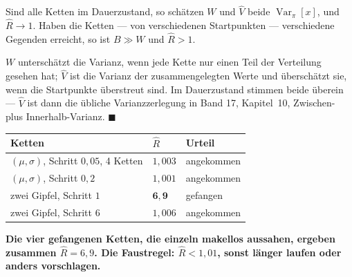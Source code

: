 \begin{merksatz}
Sind alle Ketten im Dauerzustand, so schätzen $W$ und $\hat V$ beide $\operatorname{Var}_\pi[x]$, und $\hat R \to 1$. Haben die Ketten --- von verschiedenen Startpunkten --- verschiedene Gegenden erreicht, so ist $B \gg W$ und $\hat R > 1$.

$W$ unterschätzt die Varianz, wenn jede Kette nur einen Teil der Verteilung gesehen hat; $\hat V$ ist die Varianz der zusammengelegten Werte und überschätzt sie, wenn die Startpunkte überstreut sind. Im Dauerzustand stimmen beide überein --- $\hat V$ ist dann die übliche Varianzzerlegung in Band 17, Kapitel~10, Zwischen- plus Innerhalb-Varianz. $\blacksquare$

\begin{center}
{\small
\renewcommand{\arraystretch}{1.48}
\begin{tabular}{@{}P{4.2cm}P{1.6cm}P{2.4cm}@{}}
\toprule
\textbf{Ketten} & $\hat R$ & \textbf{Urteil}\\
\midrule
$(\mu,\sigma)$, Schritt $0{,}05$, 4 Ketten & $1{,}003$ & angekommen\\
$(\mu,\sigma)$, Schritt $0{,}2$ & $1{,}001$ & angekommen\\
zwei Gipfel, Schritt $1$ & $\mathbf{6{,}9}$ & gefangen\\
zwei Gipfel, Schritt $6$ & $1{,}006$ & angekommen\\
\bottomrule
\end{tabular}}
\end{center}

\begin{center}
\begin{minipage}{0.9\textwidth}
\textbf{Die vier gefangenen Ketten, die einzeln makellos aussahen, ergeben zusammen $\hat R = 6{,}9$. Die Faustregel: $\hat R < 1{,}01$, sonst länger laufen oder anders vorschlagen.}
\end{minipage}
\end{center}

\begin{center}
\begin{minipage}{0.88\textwidth}
\end{minipage}
\end{center}
\end{merksatz}

